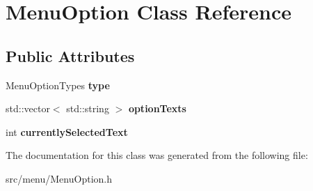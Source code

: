 \hypertarget{classMenuOption}{}\section{Menu\+Option Class Reference}
\label{classMenuOption}
\subsection*{Public Attributes}
\begin{DoxyCompactItemize}
\item 
Menu\+Option\+Types {\bfseries type}\hypertarget{classMenuOption_a61b4811cec4892cbce60d802566c2d8f}{}\label{classMenuOption_a61b4811cec4892cbce60d802566c2d8f}

\item 
std\+::vector$<$ std\+::string $>$ {\bfseries option\+Texts}\hypertarget{classMenuOption_a35c101a0eabcbd626a860196cb98fb55}{}\label{classMenuOption_a35c101a0eabcbd626a860196cb98fb55}

\item 
int {\bfseries currently\+Selected\+Text}\hypertarget{classMenuOption_a724cf1fd506327fc9754c35f3191919f}{}\label{classMenuOption_a724cf1fd506327fc9754c35f3191919f}

\end{DoxyCompactItemize}


The documentation for this class was generated from the following file\+:\begin{DoxyCompactItemize}
\item 
src/menu/Menu\+Option.\+h\end{DoxyCompactItemize}
